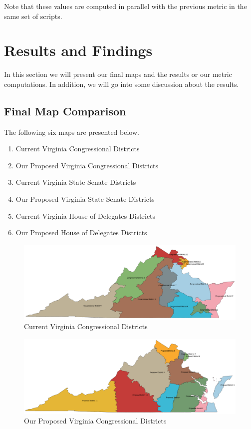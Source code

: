 \documentclass[11pt]{article}
\begin{document}
Note that these values are computed in parallel with the previous metric in the same set of scripts.

\section{Results and Findings}

In this section we will present our final maps and the results or our metric computations. In addition, we will go into some discussion about the results.

\subsection{Final Map Comparison}

The following six maps are presented below.

\begin{enumerate}
	\item Current Virginia Congressional Districts
	\item Our Proposed Virginia Congressional Districts
	\item Current Virginia State Senate Districts
	\item Our Proposed Virginia State Senate Districts
	\item Current Virginia House of Delegates Districts
	\item Our Proposed House of Delegates Districts
\end{enumerate}

\begin{figure}[H]
	\centering
	\includegraphics[width=\textwidth]{FinalMap1}
	\caption{Current Virginia Congressional Districts}
	\label{fig:fm1}
\end{figure}

\begin{figure}[H]
	\centering
	\includegraphics[width=\textwidth]{FinalMap2}
	\caption{Our Proposed Virginia Congressional Districts}
	\label{fig:fm2}
\end{figure}
\end{document}
